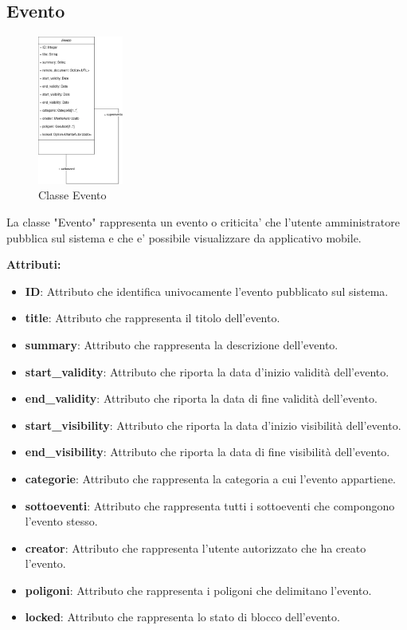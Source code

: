 \documentclass{article}
\begin{document}
\clearpage

\subsection{Evento}

\begin{figure}[htbp]
	\centering
	\includegraphics[width=0.25\textwidth]{Images/Evento-Class.png}
	\caption{Classe Evento}
	\label{fig:evento}
\end{figure}

La classe "Evento" rappresenta un evento o criticita' che l'utente amministratore pubblica sul sistema e che e' possibile visualizzare da applicativo mobile.

\textbf{Attributi:}\\
\begin{itemize}
	\item \textbf{ID}: Attributo che identifica univocamente l'evento pubblicato sul sistema.
	\item \textbf{title}: Attributo che rappresenta il titolo dell'evento.
	\item \textbf{summary}: Attributo che rappresenta la descrizione dell'evento.
	\item \textbf{start\_validity}: Attributo che riporta la data d'inizio validità dell'evento.
	\item \textbf{end\_validity}: Attributo che riporta la data di fine validità dell'evento.
	\item \textbf{start\_visibility}: Attributo che riporta la data d'inizio visibilità dell'evento.
	\item \textbf{end\_visibility}: Attributo che riporta la data di fine visibilità dell'evento.
	\item \textbf{categorie}: Attributo che rappresenta la categoria a cui l'evento appartiene.
	\item \textbf{sottoeventi}: Attributo che rappresenta tutti i sottoeventi che compongono l'evento stesso.
	\item \textbf{creator}: Attributo che rappresenta l'utente autorizzato che ha creato l'evento.
	\item \textbf{poligoni}: Attributo che rappresenta i poligoni che delimitano l'evento.
	\item \textbf{locked}: Attributo che rappresenta lo stato di blocco dell'evento.
\end{itemize}
\end{document}
